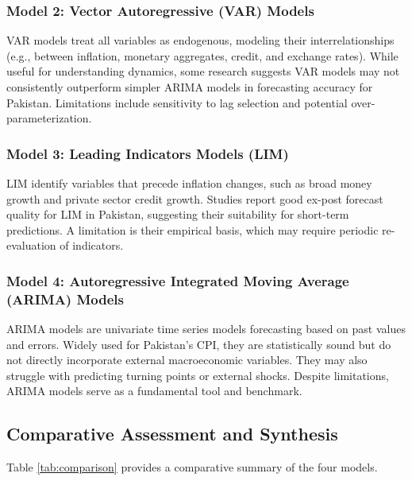 \documentclass[12pt,a4paper]{article}
\begin{document}
\subsubsection{Model 2: Vector Autoregressive (VAR) Models}
VAR models treat all variables as endogenous, modeling their interrelationships (e.g., between inflation, monetary aggregates, credit, and exchange rates). While useful for understanding dynamics, some research suggests VAR models may not consistently outperform simpler ARIMA models in forecasting accuracy for Pakistan. Limitations include sensitivity to lag selection and potential over-parameterization.

\subsubsection{Model 3: Leading Indicators Models (LIM)}
LIM identify variables that precede inflation changes, such as broad money growth and private sector credit growth. Studies report good ex-post forecast quality for LIM in Pakistan, suggesting their suitability for short-term predictions. A limitation is their empirical basis, which may require periodic re-evaluation of indicators.

\subsubsection{Model 4: Autoregressive Integrated Moving Average (ARIMA) Models}
ARIMA models are univariate time series models forecasting based on past values and errors. Widely used for Pakistan's CPI, they are statistically sound but do not directly incorporate external macroeconomic variables. They may also struggle with predicting turning points or external shocks. Despite limitations, ARIMA models serve as a fundamental tool and benchmark.

\subsection{Comparative Assessment and Synthesis}
Table \ref{tab:comparison} provides a comparative summary of the four models.
\end{document}
